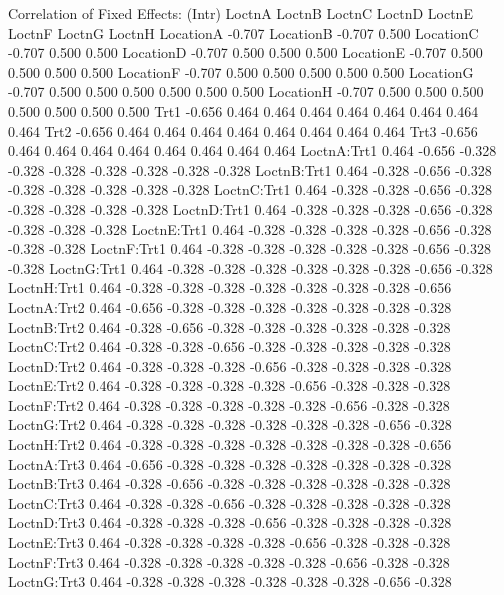 \documentclass[12pt]{article}
\begin{document}
\begin{Schunk}
\begin{Soutput}
Correlation of Fixed Effects:
            (Intr) LoctnA LoctnB LoctnC LoctnD LoctnE LoctnF LoctnG LoctnH
LocationA   -0.707                                                        
LocationB   -0.707  0.500                                                 
LocationC   -0.707  0.500  0.500                                          
LocationD   -0.707  0.500  0.500  0.500                                   
LocationE   -0.707  0.500  0.500  0.500  0.500                            
LocationF   -0.707  0.500  0.500  0.500  0.500  0.500                     
LocationG   -0.707  0.500  0.500  0.500  0.500  0.500  0.500              
LocationH   -0.707  0.500  0.500  0.500  0.500  0.500  0.500  0.500       
Trt1        -0.656  0.464  0.464  0.464  0.464  0.464  0.464  0.464  0.464
Trt2        -0.656  0.464  0.464  0.464  0.464  0.464  0.464  0.464  0.464
Trt3        -0.656  0.464  0.464  0.464  0.464  0.464  0.464  0.464  0.464
LoctnA:Trt1  0.464 -0.656 -0.328 -0.328 -0.328 -0.328 -0.328 -0.328 -0.328
LoctnB:Trt1  0.464 -0.328 -0.656 -0.328 -0.328 -0.328 -0.328 -0.328 -0.328
LoctnC:Trt1  0.464 -0.328 -0.328 -0.656 -0.328 -0.328 -0.328 -0.328 -0.328
LoctnD:Trt1  0.464 -0.328 -0.328 -0.328 -0.656 -0.328 -0.328 -0.328 -0.328
LoctnE:Trt1  0.464 -0.328 -0.328 -0.328 -0.328 -0.656 -0.328 -0.328 -0.328
LoctnF:Trt1  0.464 -0.328 -0.328 -0.328 -0.328 -0.328 -0.656 -0.328 -0.328
LoctnG:Trt1  0.464 -0.328 -0.328 -0.328 -0.328 -0.328 -0.328 -0.656 -0.328
LoctnH:Trt1  0.464 -0.328 -0.328 -0.328 -0.328 -0.328 -0.328 -0.328 -0.656
LoctnA:Trt2  0.464 -0.656 -0.328 -0.328 -0.328 -0.328 -0.328 -0.328 -0.328
LoctnB:Trt2  0.464 -0.328 -0.656 -0.328 -0.328 -0.328 -0.328 -0.328 -0.328
LoctnC:Trt2  0.464 -0.328 -0.328 -0.656 -0.328 -0.328 -0.328 -0.328 -0.328
LoctnD:Trt2  0.464 -0.328 -0.328 -0.328 -0.656 -0.328 -0.328 -0.328 -0.328
LoctnE:Trt2  0.464 -0.328 -0.328 -0.328 -0.328 -0.656 -0.328 -0.328 -0.328
LoctnF:Trt2  0.464 -0.328 -0.328 -0.328 -0.328 -0.328 -0.656 -0.328 -0.328
LoctnG:Trt2  0.464 -0.328 -0.328 -0.328 -0.328 -0.328 -0.328 -0.656 -0.328
LoctnH:Trt2  0.464 -0.328 -0.328 -0.328 -0.328 -0.328 -0.328 -0.328 -0.656
LoctnA:Trt3  0.464 -0.656 -0.328 -0.328 -0.328 -0.328 -0.328 -0.328 -0.328
LoctnB:Trt3  0.464 -0.328 -0.656 -0.328 -0.328 -0.328 -0.328 -0.328 -0.328
LoctnC:Trt3  0.464 -0.328 -0.328 -0.656 -0.328 -0.328 -0.328 -0.328 -0.328
LoctnD:Trt3  0.464 -0.328 -0.328 -0.328 -0.656 -0.328 -0.328 -0.328 -0.328
LoctnE:Trt3  0.464 -0.328 -0.328 -0.328 -0.328 -0.656 -0.328 -0.328 -0.328
LoctnF:Trt3  0.464 -0.328 -0.328 -0.328 -0.328 -0.328 -0.656 -0.328 -0.328
LoctnG:Trt3  0.464 -0.328 -0.328 -0.328 -0.328 -0.328 -0.328 -0.656 -0.328

\end{Soutput}
\end{Schunk}
\end{document}
